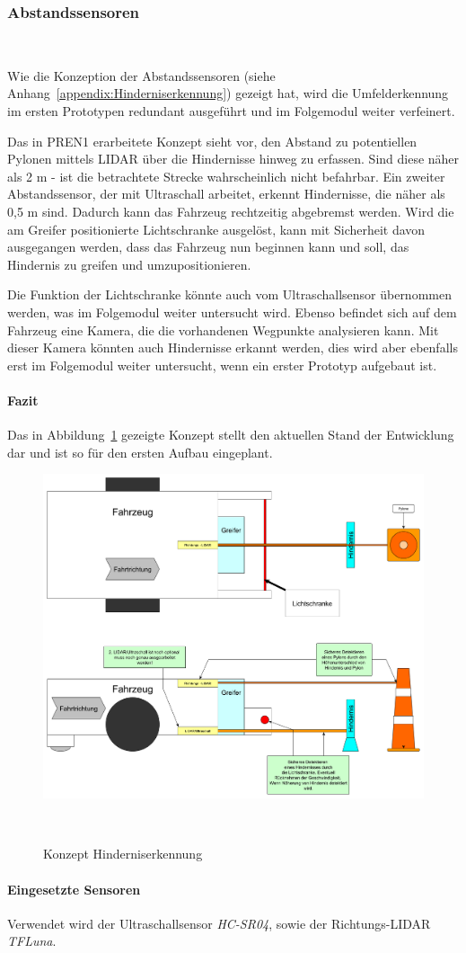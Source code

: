 \documentclass[main.tex]{subfiles} %
\begin{document}

\subsubsection{Abstandssensoren}~\label{appendix:Abstandssensoren_Kapitel}

Wie die Konzeption der Abstandssensoren (siehe
Anhang~\ref{appendix:Hinderniserkennung}) gezeigt hat, wird die Umfelderkennung
im ersten Prototypen redundant ausgeführt und im Folgemodul weiter verfeinert.

Das in PREN1 erarbeitete Konzept sieht vor, den Abstand zu potentiellen Pylonen
mittels LIDAR über die Hindernisse hinweg zu erfassen. Sind diese näher als 2 m
- ist die betrachtete Strecke wahrscheinlich nicht befahrbar. Ein zweiter
Abstandssensor, der mit Ultraschall arbeitet, erkennt Hindernisse, die näher
als 0,5 m sind. Dadurch kann das Fahrzeug rechtzeitig abgebremst werden. Wird
die am Greifer positionierte Lichtschranke ausgelöst, kann mit Sicherheit davon
ausgegangen werden, dass das Fahrzeug nun beginnen kann und soll, das Hindernis
zu greifen und umzupositionieren.

Die Funktion der Lichtschranke könnte auch vom Ultraschallsensor übernommen
werden, was im Folgemodul weiter untersucht wird. Ebenso befindet sich auf dem
Fahrzeug eine Kamera, die die vorhandenen Wegpunkte analysieren kann. Mit
dieser Kamera könnten auch Hindernisse erkannt werden, dies wird aber ebenfalls
erst im Folgemodul weiter untersucht, wenn ein erster Prototyp aufgebaut ist.

\paragraph{Fazit} 
Das in Abbildung~\ref{fig:Konzept_Hinderniserkennung} gezeigte Konzept stellt
den aktuellen Stand der Entwicklung dar und ist so für den ersten Aufbau
eingeplant.

\begin{figure}[H]
    \centering
    \includegraphics[width=0.75\linewidth]{./fig_Abstandssensor/Konzept_Hinderniserkennung.pdf}
    \caption{Konzept Hinderniserkennung}~\label{fig:Konzept_Hinderniserkennung}
\end{figure}

\paragraph{Eingesetzte Sensoren}
Verwendet wird der Ultraschallsensor \textit{HC-SR04}, sowie der
Richtungs-LIDAR \textit{TFLuna}.
\end{document}
